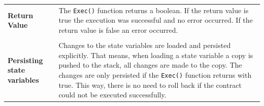 \begin{tabular}[t]{ p{3cm} p{12.5cm}}
\raggedright
\textbf{Return Value} &
The \texttt{Exec()} function returns a boolean. If the return value is true the execution was successful and no error occurred. If the return value is false an error occurred. \\ \\

\textbf{Persisting state variables} &
Changes to the state variables are loaded and persisted explicitly. That means, when loading a state variable a copy is pushed to the stack, all changes are made to the copy. The changes are only persisted if the \texttt{Exec()} function returns with true. This way, there is no need to roll back if the contract could not be executed successfully.
\end{tabular}

